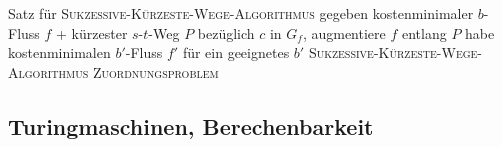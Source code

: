 
\begin{outline}
    \1 Satz für \textsc{Sukzessive-Kürzeste-Wege-Algorithmus}
        \2 gegeben kostenminimaler $b$-Fluss $f$ + kürzester $s$-$t$-Weg $P$ bezüglich $c$ in $G_f$, augmentiere $f$ entlang $P$
        \2 habe kostenminimalen $b'$-Fluss $f'$ für ein geeignetes $b'$
    \1 \textsc{Sukzessive-Kürzeste-Wege-Algorithmus}
        \2 
    \1 \textsc{Zuordnungsproblem}
\end{outline}

\subsection{Turingmaschinen, Berechenbarkeit}


